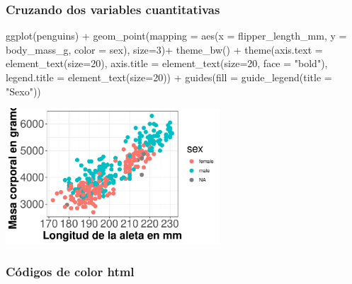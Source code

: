 \documentclass[
  letterpaper,
  DIV=11,
  numbers=noendperiod]{scrreprt}
\newenvironment{Shaded}{\begin{snugshade}}{\end{snugshade}}
\newcommand{\AttributeTok}[1]{\textcolor[rgb]{0.40,0.45,0.13}{#1}}
\newcommand{\DecValTok}[1]{\textcolor[rgb]{0.68,0.00,0.00}{#1}}
\newcommand{\FunctionTok}[1]{\textcolor[rgb]{0.28,0.35,0.67}{#1}}
\newcommand{\NormalTok}[1]{\textcolor[rgb]{0.00,0.23,0.31}{#1}}
\newcommand{\SpecialCharTok}[1]{\textcolor[rgb]{0.37,0.37,0.37}{#1}}
\newcommand{\StringTok}[1]{\textcolor[rgb]{0.13,0.47,0.30}{#1}}
\begin{document}
\subsubsection{Cruzando dos variables
cuantitativas}\label{cruzando-dos-variables-cuantitativas}

\begin{Shaded}
\begin{Highlighting}[]
\FunctionTok{ggplot}\NormalTok{(penguins) }\SpecialCharTok{+}
  \FunctionTok{geom\_point}\NormalTok{(}\AttributeTok{mapping =} \FunctionTok{aes}\NormalTok{(}\AttributeTok{x =}\NormalTok{ flipper\_length\_mm,}
                           \AttributeTok{y =}\NormalTok{ body\_mass\_g,}
                           \AttributeTok{color =}\NormalTok{ sex), }\AttributeTok{size=}\DecValTok{3}\NormalTok{)}\SpecialCharTok{+} \FunctionTok{theme\_bw}\NormalTok{() }\SpecialCharTok{+}
  \FunctionTok{theme}\NormalTok{(}\AttributeTok{axis.text =} \FunctionTok{element\_text}\NormalTok{(}\AttributeTok{size=}\DecValTok{20}\NormalTok{),}
        \AttributeTok{axis.title =} \FunctionTok{element\_text}\NormalTok{(}\AttributeTok{size=}\DecValTok{20}\NormalTok{, }\AttributeTok{face =} \StringTok{"bold"}\NormalTok{),}
        \AttributeTok{legend.title =} \FunctionTok{element\_text}\NormalTok{(}\AttributeTok{size=}\DecValTok{20}\NormalTok{)) }\SpecialCharTok{+} 
  \FunctionTok{guides}\NormalTok{(}\AttributeTok{fill =} \FunctionTok{guide\_legend}\NormalTok{(}\AttributeTok{title =} \StringTok{"Sexo"}\NormalTok{))}
\end{Highlighting}
\end{Shaded}

\begin{center}
\includegraphics[width=0.6\textwidth,height=0.6\textheight]{t1_intro_files/figure-pdf/unnamed-chunk-103-1.pdf}
\end{center}

\subsubsection{Códigos de color html}\label{cuxf3digos-de-color-html}
\end{document}
